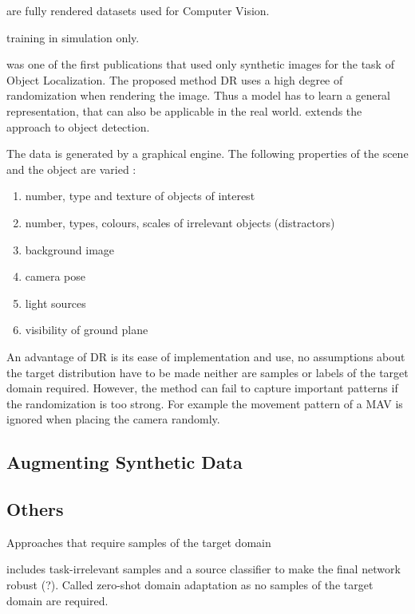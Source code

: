 \cite{Ros2016, Gaidon2016} are fully rendered datasets used for Computer Vision. 

\cite{Johnson-Roberson2016} training in simulation only.

\cite{Tobin2017} was one of the first publications that used only synthetic images for the task of Object Localization. The proposed method \ac{DR} uses a high degree of randomization when rendering the image. Thus a model has to learn a general representation, that can also be applicable in the real world. \cite{Tremblay2018a} extends the approach to object detection.

The data is generated by a graphical engine. The following properties of the scene and the object are varied \cite{Tremblay2018a}:

\begin{enumerate}
	\item number, type and texture of objects of interest
	\item number, types, colours, scales of irrelevant objects (distractors)
	\item background image
	\item camera pose
	\item light sources
	\item visibility of ground plane
\end{enumerate}

An advantage of \ac{DR} is its ease of implementation and use, no assumptions about the target distribution have to be made neither are samples or labels of the target domain required. However, the method can fail to capture important patterns if the randomization is too strong. For example the movement pattern of a \ac{MAV} is ignored when placing the camera randomly.


\subsection{Augmenting Synthetic Data}

\subsection{Others}
Approaches that require samples of the target domain \cite{Chen2018c} \cite{Xu2017} \cite{Inoue} 

\cite{Peng2017} includes task-irrelevant samples and a source classifier to make the final network robust (?). Called zero-shot domain adaptation as no samples of the target domain are required.



